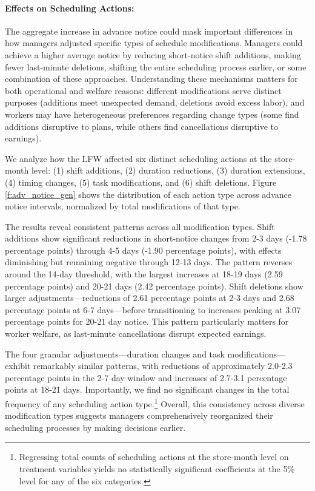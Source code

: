 \documentclass[letterpaper,11pt,leqno]{article}
\theoremstyle{paper}
\begin{document}
\paragraph{Effects on Scheduling Actions:}

The aggregate increase in advance notice could mask important differences in how managers adjusted specific types of schedule modifications. Managers could achieve a higher average notice by reducing short-notice shift additions, making fewer last-minute deletions, shifting the entire scheduling process earlier, or some combination of these approaches. Understanding these mechanisms matters for both operational and welfare reasons: different modifications serve distinct purposes (additions meet unexpected demand, deletions avoid excess labor), and workers may have heterogeneous preferences regarding change types (some find additions disruptive to plans, while others find cancellations disruptive to earnings).

We analyze how the LFW affected six distinct scheduling actions at the store-month level: (1) shift additions, (2) duration reductions, (3) duration extensions, (4) timing changes, (5) task modifications, and (6) shift deletions. Figure \ref{f:adv_notice_gen} shows the distribution of each action type across advance notice intervals, normalized by total modifications of that type.

The results reveal consistent patterns across all modification types. Shift additions show significant reductions in short-notice changes from 2-3 days (-1.78 percentage points) through 4-5 days (-1.90 percentage points), with effects diminishing but remaining negative through 12-13 days. The pattern reverses around the 14-day threshold, with the largest increases at 18-19 days (2.59 percentage points) and 20-21 days (2.42 percentage points). Shift deletions show larger adjustments—reductions of 2.61 percentage points at 2-3 days and 2.68 percentage points at 6-7 days—before transitioning to increases peaking at 3.07 percentage points for 20-21 day notice. This pattern particularly matters for worker welfare, as last-minute cancellations disrupt expected earnings.

The four granular adjustments—duration changes and task modifications—exhibit remarkably similar patterns, with reductions of approximately 2.0-2.3 percentage points in the 2-7 day window and increases of 2.7-3.1 percentage points at 18-21 days. Importantly, we find no significant changes in the total frequency of any scheduling action type.\footnote{Regressing total counts of scheduling actions at the store-month level on treatment variables yields no statistically significant coefficients at the 5\% level for any of the six categories.} Overall, this consistency across diverse modification types suggests managers comprehensively reorganized their scheduling processes by making decisions earlier. 
\end{document}
